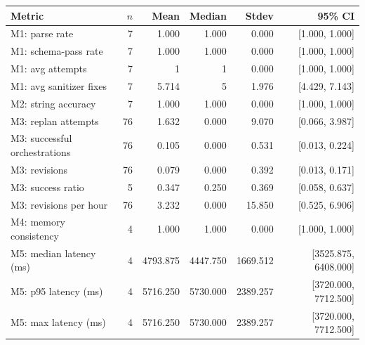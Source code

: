 \begin{tabular}{lrrrrr}
\toprule
Metric & $n$ & Mean & Median & Stdev & 95\% CI \\
\midrule
M1: parse rate & 7 & 1.000 & 1.000 & 0.000 & [1.000, 1.000] \\
M1: schema-pass rate & 7 & 1.000 & 1.000 & 0.000 & [1.000, 1.000] \\
M1: avg attempts & 7 & 1 & 1 & 0.000 & [1.000, 1.000] \\
M1: avg sanitizer fixes & 7 & 5.714 & 5 & 1.976 & [4.429, 7.143] \\
M2: string accuracy & 7 & 1.000 & 1.000 & 0.000 & [1.000, 1.000] \\
M3: replan attempts & 76 & 1.632 & 0.000 & 9.070 & [0.066, 3.987] \\
M3: successful orchestrations & 76 & 0.105 & 0.000 & 0.531 & [0.013, 0.224] \\
M3: revisions & 76 & 0.079 & 0.000 & 0.392 & [0.013, 0.171] \\
M3: success ratio & 5 & 0.347 & 0.250 & 0.369 & [0.058, 0.637] \\
M3: revisions per hour & 76 & 3.232 & 0.000 & 15.850 & [0.525, 6.906] \\
M4: memory consistency & 4 & 1.000 & 1.000 & 0.000 & [1.000, 1.000] \\
M5: median latency (ms) & 4 & 4793.875 & 4447.750 & 1669.512 & [3525.875, 6408.000] \\
M5: p95 latency (ms) & 4 & 5716.250 & 5730.000 & 2389.257 & [3720.000, 7712.500] \\
M5: max latency (ms) & 4 & 5716.250 & 5730.000 & 2389.257 & [3720.000, 7712.500] \\
\bottomrule
\end{tabular}